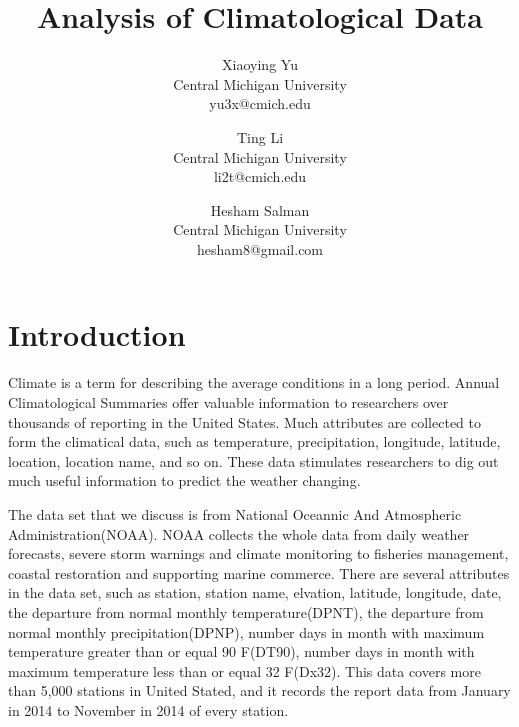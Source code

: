 \documentclass[11pt]{article}
\begin{document}
\title{Analysis of Climatological Data}
\author{Xiaoying Yu\\Central Michigan University\\yu3x@cmich.edu
\and Ting Li\\Central Michigan University\\li2t@cmich.edu
\and Hesham Salman\\Central Michigan University\\hesham8@gmail.com}
\maketitle
\newpage
\begin{abstract}
\end{abstract}
\newpage
\section{Introduction}
Climate is a term for describing the average conditions in a long period. Annual Climatological Summaries offer valuable information to researchers over thousands of reporting in the United States. Much attributes are collected to form the climatical data, such as temperature, precipitation, longitude, latitude, location, location name, and so on. These data stimulates researchers to dig out much useful information to predict the weather changing.

The data set that we discuss is from National Oceannic And Atmospheric Administration(NOAA)\cite{center2010national}. NOAA collects the whole data from daily weather forecasts, severe storm warnings and climate monitoring to fisheries management, coastal restoration and supporting marine commerce\cite{center2010national}.  There are several attributes in the data set, such as station, station name, elvation, latitude, longitude, date, the departure from normal monthly temperature(DPNT), the departure from normal monthly precipitation(DPNP), number days in month with maximum temperature greater than or equal 90 F(DT90), number days in month with maximum temperature less than or equal 32 F(Dx32). This data covers more than 5,000 stations in United Stated, and it records the report data from January in 2014 to November in 2014 of every station.
\end{document}
